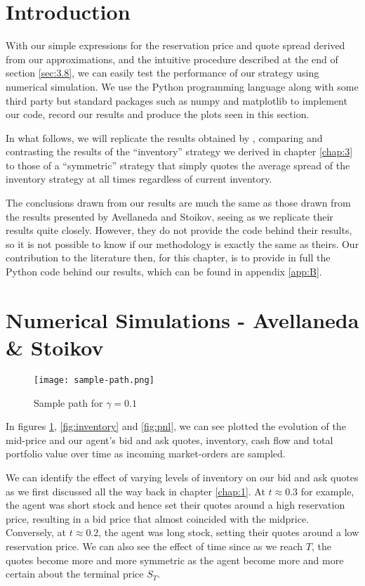 \section{Introduction}

With our simple expressions for the reservation price and quote
spread derived from our approximations, and the intuitive procedure
described at the end of section \ref{sec:3.8}, we can easily test 
the performance of our strategy using numerical simulation. We use the Python 
programming language along with some third party but standard packages such as 
numpy and matplotlib to implement our code, record our results and produce the 
plots seen in this section. 

In what follows, we will replicate the results obtained 
by \textcite{AS2008}, comparing and contrasting the results of the ``inventory'' strategy
we derived in chapter \ref{chap:3} to those of a ``symmetric'' strategy that simply
quotes the average spread of the inventory strategy at all times regardless of current
inventory. 

The conclusions drawn from our results are much the same as those drawn 
from the results presented by Avellaneda and Stoikov, seeing as we replicate their 
results quite closely. However, they do not provide the code behind their results, 
so it is not possible to know if our methodology is exactly the same as 
theirs. Our contribution to the literature then, for this chapter, is to provide in 
full the Python code behind our results, which can be found in appendix \ref{app:B}.

\section{Numerical Simulations - Avellaneda \& Stoikov}

\begin{figure}[ht!]
    \centering
        \texttt{[image: sample-path.png]}
        \caption{Sample path for $\gamma=0.1$}
        \label{fig:sample-paths}
\end{figure}

In figures \ref{fig:sample-paths}, \ref{fig:inventory} and \ref{fig:pnl}, we can see 
plotted the evolution of the mid-price and our agent's bid and ask quotes, inventory,
cash flow and total portfolio value over time as incoming market-orders are sampled.

We can identify the effect of varying levels of inventory on our bid 
and ask quotes as we first discussed all the way back in chapter \ref{chap:1}. At 
$t\approx0.3$ for example, the agent was short stock and hence set their quotes around 
a high reservation price, resulting in a bid price that almost coincided with the 
midprice. Conversely, at $t\approx0.2$, the agent was long stock, setting their quotes 
around a low reservation price. We can also see the effect of time since as we reach $T$, 
the quotes become more and more symmetric as the agent become more and more certain 
about the terminal price $S_T$.

